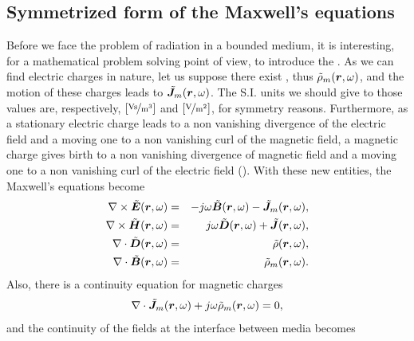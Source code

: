 \subsection{Symmetrized form of the Maxwell's equations} %

\par Before we face the problem of radiation in a bounded medium, it is interesting, for a mathematical problem solving point of view, to introduce the . As we can find electric charges in nature, let us suppose there exist , thus  $\tilde{\rho}_m(\mbfit{r},\omega)$, and the motion of these charges leads to  $\tilde{\mbfit{J}}_m(\mbfit{r},\omega)$. The S.I. units we should give to those values are, respectively, $\mathrm{[\nicefrac{\mathrm{Vs}}{m^3}]}$ and $\mathrm{[\nicefrac{\mathrm{V}}{m^2}]}$, for symmetry reasons. Furthermore, as a stationary electric charge leads to a non vanishing divergence of the electric field and a moving one to a non vanishing curl of the magnetic field, a magnetic charge gives birth to a non vanishing divergence of magnetic field and a moving one to a non vanishing curl of the electric field (). With these new entities, the Maxwell's equations become
\begin{eqnarray}
\nabla \times \tilde{\mbfit{E}}(\mbfit{r},\omega) &= & -j\omega\tilde{\mbfit{B}}(\mbfit{r},\omega)  - \tilde{\mbfit{J}}_m(\mbfit{r},\omega), \label{eq:sffaraday} \\
\nabla \times \tilde{\mbfit{H}}(\mbfit{r},\omega) &= & j\omega\tilde{\mbfit{D}}(\mbfit{r},\omega) + \tilde{\mbfit{J}}(\mbfit{r},\omega), \label{eq:sfampere} \\
\nabla \cdot \tilde{\mbfit{D}}(\mbfit{r},\omega) &= & \tilde{\rho}(\mbfit{r},\omega), \label{eq:sfpoisson}\\
\nabla \cdot \tilde{\mbfit{B}}(\mbfit{r},\omega) &= & \tilde{\rho}_m(\mbfit{r},\omega).\label{eq:sfgauss}
\end{eqnarray}
Also, there is a continuity equation for magnetic charges
\begin{equation}
\nabla \cdot \tilde{\mbfit{J}}_m(\mbfit{r},\omega) + j \omega \tilde{\rho}_m(\mbfit{r},\omega) = 0, \label{eq:contJm}
\end{equation}
and the continuity of the fields at the interface between media becomes
